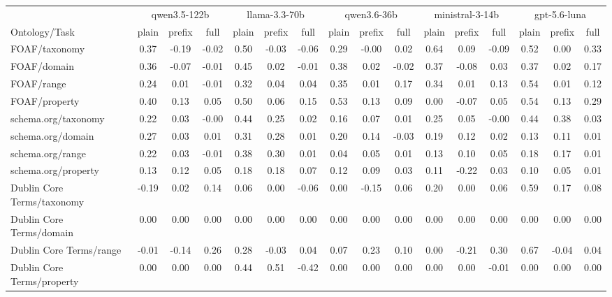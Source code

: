 \begin{tabular}{lccccccccccccccc}
\toprule
 & \multicolumn{3}{c}{qwen3.5-122b} & \multicolumn{3}{c}{llama-3.3-70b} & \multicolumn{3}{c}{qwen3.6-36b} & \multicolumn{3}{c}{ministral-3-14b} & \multicolumn{3}{c}{gpt-5.6-luna} \\
\cmidrule(lr){2-4} \cmidrule(lr){5-7} \cmidrule(lr){8-10} \cmidrule(lr){11-13} \cmidrule(lr){14-16}
Ontology/Task & plain & prefix & full & plain & prefix & full & plain & prefix & full & plain & prefix & full & plain & prefix & full \\
\midrule
FOAF/taxonomy & 0.37 & -0.19 & -0.02 & 0.50 & -0.03 & -0.06 & 0.29 & -0.00 & 0.02 & 0.64 & 0.09 & -0.09 & 0.52 & 0.00 & 0.33 \\
FOAF/domain & 0.36 & -0.07 & -0.01 & 0.45 & 0.02 & -0.01 & 0.38 & 0.02 & -0.02 & 0.37 & -0.08 & 0.03 & 0.37 & 0.02 & 0.17 \\
FOAF/range & 0.24 & 0.01 & -0.01 & 0.32 & 0.04 & 0.04 & 0.35 & 0.01 & 0.17 & 0.34 & 0.01 & 0.13 & 0.54 & 0.01 & 0.12 \\
FOAF/property & 0.40 & 0.13 & 0.05 & 0.50 & 0.06 & 0.15 & 0.53 & 0.13 & 0.09 & 0.00 & -0.07 & 0.05 & 0.54 & 0.13 & 0.29 \\
schema.org/taxonomy & 0.22 & 0.03 & -0.00 & 0.44 & 0.25 & 0.02 & 0.16 & 0.07 & 0.01 & 0.25 & 0.05 & -0.00 & 0.44 & 0.38 & 0.03 \\
schema.org/domain & 0.27 & 0.03 & 0.01 & 0.31 & 0.28 & 0.01 & 0.20 & 0.14 & -0.03 & 0.19 & 0.12 & 0.02 & 0.13 & 0.11 & 0.01 \\
schema.org/range & 0.22 & 0.03 & -0.01 & 0.38 & 0.30 & 0.01 & 0.04 & 0.05 & 0.01 & 0.13 & 0.10 & 0.05 & 0.18 & 0.17 & 0.01 \\
schema.org/property & 0.13 & 0.12 & 0.05 & 0.18 & 0.18 & 0.07 & 0.12 & 0.09 & 0.03 & 0.11 & -0.22 & 0.03 & 0.10 & 0.05 & 0.01 \\
Dublin Core Terms/taxonomy & -0.19 & 0.02 & 0.14 & 0.06 & 0.00 & -0.06 & 0.00 & -0.15 & 0.06 & 0.20 & 0.00 & 0.06 & 0.59 & 0.17 & 0.08 \\
Dublin Core Terms/domain & 0.00 & 0.00 & 0.00 & 0.00 & 0.00 & 0.00 & 0.00 & 0.00 & 0.00 & 0.00 & 0.00 & 0.00 & 0.00 & 0.00 & 0.00 \\
Dublin Core Terms/range & -0.01 & -0.14 & 0.26 & 0.28 & -0.03 & 0.04 & 0.07 & 0.23 & 0.10 & 0.00 & -0.21 & 0.30 & 0.67 & -0.04 & 0.04 \\
Dublin Core Terms/property & 0.00 & 0.00 & 0.00 & 0.44 & 0.51 & -0.42 & 0.00 & 0.00 & 0.00 & 0.00 & 0.00 & -0.01 & 0.00 & 0.00 & 0.00 \\

\end{tabular}
